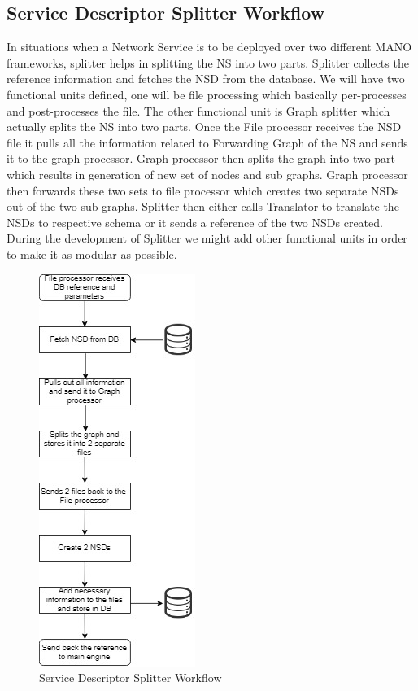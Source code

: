 \subsection{Service Descriptor Splitter Workflow}
In situations when a Network Service is to be deployed over two different MANO frameworks, splitter helps in splitting the NS into two parts. Splitter collects the reference information and fetches the NSD from the database. We will have two functional units defined, one will be file processing which basically per-processes and post-processes the file. The other functional unit is Graph splitter which actually splits the NS into two parts. Once the File processor receives the NSD file it pulls all the information related to Forwarding Graph of the NS and sends it to the graph processor. Graph processor then splits the graph into two part which results in generation of new set of nodes and sub graphs. Graph processor then forwards these two sets to file processor which creates two separate NSDs out of the two sub graphs. Splitter then either calls Translator to translate the NSDs to respective schema or it sends a reference of the two NSDs created. During the development of Splitter we might add other functional units in order to make it as modular as possible.
\begin{figure}[H]
	\centering
	\includegraphics[width=0.5\linewidth]{figures/SDS_Workflow}
	\caption{Service Descriptor Splitter Workflow}
	\label{fig:sdsworkflow}
\end{figure}


